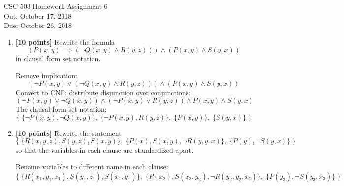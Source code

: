 \documentclass{article}
\begin{document}
\begin{center}
  {\LARGE CSC 503 Homework Assignment 6}\\[1pc]
  Out: October 17, 2018 \\
  Due: October 26, 2018 \\
\end{center}

\begin{enumerate}

\item \textbf{[10 points]} Rewrite the formula
  \begin{displaymath}
    (P(x,y) \implies (\neg Q(x,y) \land R(y,z))) \land (P(x,y) \land
    S(y,x))
\end{displaymath}
in clausal form set notation.

\begin{answer}
  Remove implication:\\
  \begin{displaymath}
    (\neg P(x,y) \lor (\neg Q(x,y) \land R(y,z))) \land (P(x,y) \land
    S(y,x))
  \end{displaymath}
  Convert to CNF: distribute disjunction over conjunctions:\\
  \begin{displaymath}
    (\neg P(x,y) \lor \neg Q(x,y)) \land (\neg P(x,y) \lor R(y,z)) \land P(x,y) \land
    S(y,x)
  \end{displaymath}
  The clausal form set notation:\\
  \begin{displaymath}
    \{ \; 
    \{\neg P(x,y), \neg Q(x,y)\}, 
    \;
    \{\neg P(x,y), R(y,z)\}, 
    \;
    \{P(x,y)\}, 
    \;
    \{S(y,x)\}
    \; \}
  \end{displaymath}
\end{answer}

\item \textbf{[10 points]} Rewrite the statement
  \begin{displaymath}
    \{ \;
    \{ R(x,y,z), S(y,z), S(x,y) \},
    \;
    \{ P(x), S(x,y), \neg R(y,y,x) \},
    \;
    \{ P(y), \neg S(y,x) \}
    \; \}
  \end{displaymath}
  so that the variables in each clause are standardized apart.

  \begin{answer}
    Rename variables to different name in each clause:\\
    \begin{displaymath}
      \{ \;
      \{ R(x_1,y_1,z_1), S(y_1,z_1), S(x_1,y_1) \},
      \;
      \{ P(x_2), S(x_2,y_2), \neg R(y_2,y_2,x_2) \},
      \;
      \{ P(y_3), \neg S(y_3,x_3) \}
      \; \}
    \end{displaymath}
  \end{answer}
  

\end{enumerate}
\end{document}
